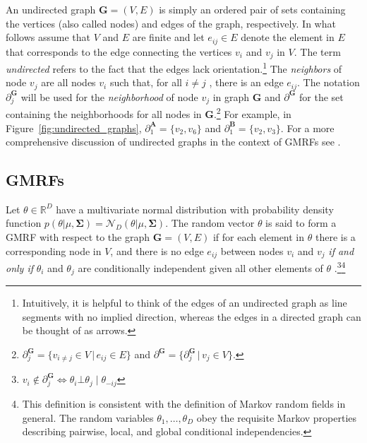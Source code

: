  An undirected graph $\mathbf{G} = (V,E)$ is simply an ordered pair of sets containing the vertices (also called nodes) and edges of the graph, respectively. In what follows assume that $V$ and $E$ are finite and let $e_{ij} \in E$ denote the element in $E$ that corresponds to the edge connecting the vertices $v_i$ and $v_j$ in $V$. The term {\it undirected} refers to the fact that the edges lack orientation.\footnote{Intuitively, it is helpful to think of the edges of an undirected graph as line segments with no implied direction, whereas the edges in a directed graph can be thought of as arrows.} The {\it neighbors} of node $v_j$ are all nodes $v_i$ such that, for all $i \neq j$ , there is an edge $e_{ij}$. The notation $\partial^{\mathbf{G}}_j$ will be used for the {\it neighborhood} of node $v_j$ in graph  $\mathbf{G}$ and $\partial^\mathbf{G}$ for the set containing the neighborhoods for all nodes in $\mathbf{G}$.\footnote{$ \partial^\mathbf{G}_j = \{v_{i \neq j} \in V \,\vert\, e_{ij} \in E\}$ and $\partial^\mathbf{G} = \{\partial^\mathbf{G}_j \,\vert\, v_j \in V\}$.} For example, in Figure~\ref{fig:undirected_graphs}, $\partial^{\mathbf{A}}_1 = \{v_2, v_6\}$ and $\partial^{\mathbf{B}}_1 = \{v_2, v_3\}$.  For a more comprehensive discussion of undirected graphs in the context of GMRFs see . 
 

\subsection{GMRFs}
Let $\theta \in \mathbb{R}^D$ have a multivariate normal distribution with probability density function $p(\theta | \mu, \boldsymbol{\Sigma}) = \mathcal{N}_D (\theta | \mu, \boldsymbol{\Sigma})$. The random vector $\theta$ is said to form a GMRF with respect to the graph $\mathbf{G} = (V,E)$ if for each element in $\theta$ there is a corresponding node in $V$, and there is no edge $e_{ij}$ between nodes $v_i$ and $v_j$ \emph{if and only if} $\theta_i$ and $\theta_j$ are conditionally independent given all other elements of $\theta$ .\footnote{$v_i \notin \partial^\mathbf{G}_{j} \iff \theta_i \bot \theta_j \mid \theta_{-ij}$}\footnote{This definition is consistent with the definition of Markov random fields in general. The random variables $\theta_1, \dots, \theta_D$ obey the requisite Markov properties describing pairwise, local, and global conditional independencies.} 

